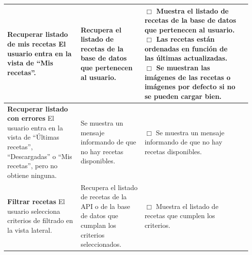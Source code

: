 \begin{center}
\begin{longtable}{|p{3.75cm}|p{3.5cm}|p{5.25cm}|p{1.5cm}|}
    \textbf{Recuperar listado de mis recetas}\newline
    El usuario entra en la vista de ``Mis recetas''. &
    Recupera el listado de recetas de la base de datos que pertenecen al
    usuario. &
    $\Box$ Muestra el listado de recetas de la base de datos que pertenecen al
    usuario.\newline
    $\Box$ Las recetas están ordenadas en función de las últimas
    actualizadas.\newline
    $\Box$ Se muestran las imágenes de las recetas o imágenes por defecto si no
    se pueden cargar bien. & \\ \hline

    \textbf{Recuperar listado con errores}\newline
    El usuario entra en la vista de ``Últimas recetas'', ``Descargadas'' o ``Mis
    recetas'', pero no obtiene ninguna. &
    Se muestra un mensaje informando de que no hay recetas disponibles. &
    $\Box$ Se muestra un mensaje informando de que no hay recetas
    disponibles. & \\ \hline

    \textbf{Filtrar recetas}\newline
    El usuario selecciona criterios de filtrado en la vista lateral. &
    Recupera el listado de recetas de la API o de la base de datos que cumplan
    los criterios seleccionados. &
    $\Box$ Muestra el listado de recetas que cumplen los criterios. & \\ \hline
  \end{longtable}
\end{center}


